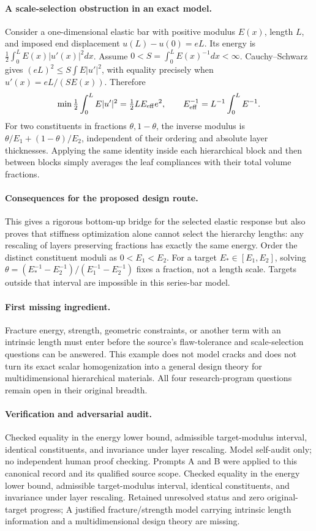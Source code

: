 \documentclass[11pt]{article}
\begin{document}
\paragraph{A scale-selection obstruction in an exact model.} Consider a one-dimensional elastic bar with positive modulus $E(x)$, length $L$, and imposed end displacement $u(L)-u(0)=eL$. Its energy is $\frac12\int_0^L E(x)|u'(x)|^2dx$. Assume $0<S=\int_0^LE(x)^{-1}dx<\infty$. Cauchy--Schwarz gives $(eL)^2\leq S\int E|u'|^2$, with equality precisely when $u'(x)=eL/(SE(x))$. Therefore
\[
 \min\tfrac12\int_0^L E|u'|^2=\tfrac12LE_{\rm eff}e^2,
 \qquad E_{\rm eff}^{-1}=L^{-1}\int_0^L E^{-1}.
\]
For two constituents in fractions $\theta,1-\theta$, the inverse modulus is $\theta/E_1+(1-\theta)/E_2$, independent of their ordering and absolute layer thicknesses. Applying the same identity inside each hierarchical block and then between blocks simply averages the leaf compliances with their total volume fractions.

\paragraph{Consequences for the proposed design route.} This gives a rigorous bottom-up bridge for the selected elastic response but also proves that stiffness optimization alone cannot select the hierarchy lengths: any rescaling of layers preserving fractions has exactly the same energy. Order the distinct constituent moduli as $0<E_1<E_2$. For a target $E_*\in[E_1,E_2]$, solving $\theta=(E_*^{-1}-E_2^{-1})/(E_1^{-1}-E_2^{-1})$ fixes a fraction, not a length scale. Targets outside that interval are impossible in this series-bar model.

\paragraph{First missing ingredient.} Fracture energy, strength, geometric constraints, or another term with an intrinsic length must enter before the source's flaw-tolerance and scale-selection questions can be answered. This example does not model cracks and does not turn its exact scalar homogenization into a general design theory for multidimensional hierarchical materials. All four research-program questions remain open in their original breadth.

\paragraph{Verification and adversarial audit.}
Checked equality in the energy lower bound, admissible target-modulus interval, identical constituents, and invariance under layer rescaling. Model self-audit only; no independent human proof checking. Prompts A and B were applied to this canonical record and its qualified source scope. Checked equality in the energy lower bound, admissible target-modulus interval, identical constituents, and invariance under layer rescaling. Retained unresolved status and zero original-target progress; A justified fracture/strength model carrying intrinsic length information and a multidimensional design theory are missing.
\end{document}
